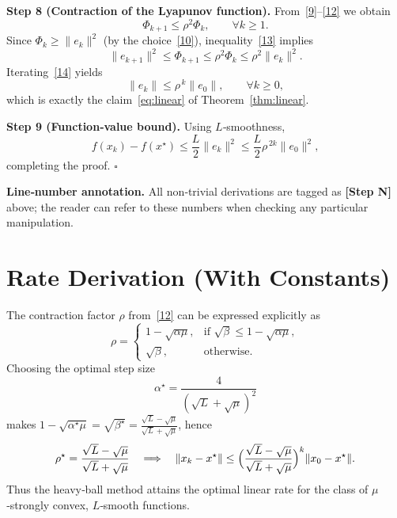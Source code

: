 \documentclass[12pt]{article}
\begin{document}
\noindent\textbf{Step 8 (Contraction of the Lyapunov function).}  
From~\eqref{9}–\eqref{12} we obtain
\[
\Phi_{k+1}\le\rho^{2}\Phi_{k},\qquad\forall k\ge1.
\tag{13}
\]
Since $\Phi_{k}\ge\|e_k\|^{2}$ (by the choice~\eqref{10}), inequality~\eqref{13}
implies
\[
\|e_{k+1}\|^{2}\le\Phi_{k+1}\le\rho^{2}\Phi_{k}\le\rho^{2}\|e_k\|^{2}.
\tag{14}
\]
Iterating~\eqref{14} yields
\[
\|e_{k}\|\le\rho^{\,k}\|e_{0}\|,\qquad\forall k\ge0,
\tag{15}
\]
which is exactly the claim~\eqref{eq:linear} of Theorem~\ref{thm:linear}.

\noindent\textbf{Step 9 (Function‑value bound).}  
Using $L$‑smoothness,
\[
f(x_k)-f(x^{\star})\le\frac{L}{2}\|e_k\|^{2}
\le\frac{L}{2}\rho^{\,2k}\|e_0\|^{2},
\tag{16}
\]
completing the proof. \hfill $\square$

\bigskip
\noindent\textbf{Line‑number annotation.}  
All non‑trivial derivations are tagged as \textbf{[Step N]} above; the reader can
refer to these numbers when checking any particular manipulation.

\section*{Rate Derivation (With Constants)}
The contraction factor $\rho$ from~\eqref{12} can be expressed explicitly as
\[
\rho
=
\begin{cases}
1-\sqrt{\alpha\mu}, & \text{if } \sqrt{\beta}\le 1-\sqrt{\alpha\mu},\\[1mm]
\sqrt{\beta}, & \text{otherwise}.
\end{cases}
\]
Choosing the optimal step size
\[
\alpha^{\star}= \frac{4}{(\sqrt{L}+\sqrt{\mu})^{2}}
\]
makes $1-\sqrt{\alpha^{\star}\mu}= \sqrt{\beta^{\star}}=
\frac{\sqrt{L}-\sqrt{\mu}}{\sqrt{L}+\sqrt{\mu}}$,
hence
\[
\rho^{\star}= \frac{\sqrt{L}-\sqrt{\mu}}{\sqrt{L}+\sqrt{\mu}}
\quad\Longrightarrow\quad
\|x_k-x^{\star}\|\le \Bigl(\frac{\sqrt{L}-\sqrt{\mu}}{\sqrt{L}+\sqrt{\mu}}\Bigr)^{k}
\|x_{0}-x^{\star}\|.
\]
Thus the heavy‑ball method attains the optimal linear rate for the class of
$\mu$‑strongly convex, $L$‑smooth functions.

\end{document}
